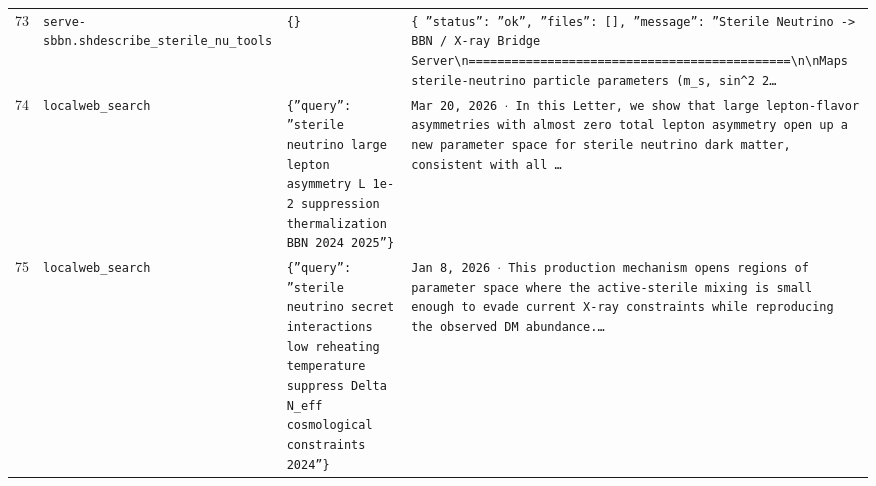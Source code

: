 \documentclass[11pt,a4paper]{article}
\begin{document}
\begin{longtable}{@{}p{}p{}p{}p{}@{}}
73 & \texttt{serve-sbbn.sh}\newline\texttt{describe\_\allowbreak{}sterile\_\allowbreak{}nu\_\allowbreak{}tools} & \texttt{\{\}\allowbreak{}} & \texttt{\{   ''status'':\allowbreak{} ''ok'',\allowbreak{}   ''files'':\allowbreak{} []\allowbreak{},\allowbreak{}   ''message'':\allowbreak{} ''Sterile Neutrino -\textgreater{}\allowbreak{} BBN /\allowbreak{} X-ray Bridge Server\textbackslash{}\allowbreak{}n=\allowbreak{}=\allowbreak{}=\allowbreak{}=\allowbreak{}=\allowbreak{}=\allowbreak{}=\allowbreak{}=\allowbreak{}=\allowbreak{}=\allowbreak{}=\allowbreak{}=\allowbreak{}=\allowbreak{}=\allowbreak{}=\allowbreak{}=\allowbreak{}=\allowbreak{}=\allowbreak{}=\allowbreak{}=\allowbreak{}=\allowbreak{}=\allowbreak{}=\allowbreak{}=\allowbreak{}=\allowbreak{}=\allowbreak{}=\allowbreak{}=\allowbreak{}=\allowbreak{}=\allowbreak{}=\allowbreak{}=\allowbreak{}=\allowbreak{}=\allowbreak{}=\allowbreak{}=\allowbreak{}=\allowbreak{}=\allowbreak{}=\allowbreak{}=\allowbreak{}=\allowbreak{}=\allowbreak{}=\allowbreak{}=\allowbreak{}=\allowbreak{}\textbackslash{}\allowbreak{}n\textbackslash{}\allowbreak{}nMaps sterile-neutrino particle parameters (m\_\allowbreak{}s,\allowbreak{} sin\textasciicircum{}\allowbreak{}2 2\ldots{}\allowbreak{}} \\
74 & \texttt{local}\newline\texttt{web\_\allowbreak{}search} & \texttt{\{''query'':\allowbreak{} ''sterile neutrino large lepton asymmetry L 1e-2 suppression thermalization BBN 2024 2025''\}\allowbreak{}} & \texttt{Mar 20,\allowbreak{} 2026 $\cdot$ In this Letter,\allowbreak{} we show that large lepton-flavor asymmetries with almost zero total lepton asymmetry open up a new parameter space for sterile neutrino dark matter,\allowbreak{} consistent with all \ldots{}\allowbreak{}} \\
75 & \texttt{local}\newline\texttt{web\_\allowbreak{}search} & \texttt{\{''query'':\allowbreak{} ''sterile neutrino secret interactions low reheating temperature suppress Delta N\_\allowbreak{}eff cosmological constraints 2024''\}\allowbreak{}} & \texttt{Jan 8,\allowbreak{} 2026 $\cdot$ This production mechanism opens regions of parameter space where the active-sterile mixing is small enough to evade current X-ray constraints while reproducing the observed DM abundance.\ldots{}\allowbreak{}} \\

\end{longtable}
\end{document}
